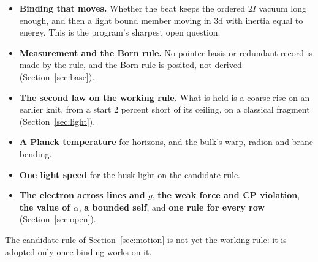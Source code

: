 \begin{itemize}
\item \textbf{Binding that moves.} Whether the beat keeps the ordered $2I$ vacuum long enough, and then a light bound
member moving in 3d with inertia equal to energy. This is the program's sharpest open question.
\item \textbf{Measurement and the Born rule.} No pointer basis or redundant record is made by the rule, and the Born
rule is posited, not derived (Section~\ref{sec:base}).
\item \textbf{The second law on the working rule.} What is held is a coarse rise on an earlier knit, from a start 2
percent short of its ceiling, on a classical fragment (Section~\ref{sec:light}).
\item \textbf{A Planck temperature} for horizons, and the bulk's warp, radion and brane bending.
\item \textbf{One light speed} for the husk light on the candidate rule.
\item \textbf{The electron across lines and $g$}, \textbf{the weak force and CP violation}, \textbf{the value of
$\alpha$}, \textbf{a bounded self}, and \textbf{one rule for every row} (Section~\ref{sec:open}).
\end{itemize}

The candidate rule of Section~\ref{sec:motion} is not yet the working rule: it is adopted only once binding works
on it.
